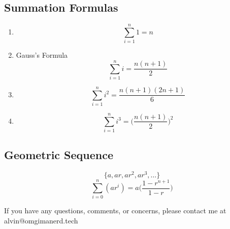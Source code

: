\documentclass[letterpaper, 12pt]{math}
\begin{document}
\subsection*{Summation Formulas}
\begin{enumerate}
  \item
    \[ \sum_{i=1}^{n}1 = n \]
  \item Gauss's Formula
    \[ \sum_{i=1}^{n}i = \frac{n(n+1)}{2} \]
  \item
    \[ \sum_{i=1}^{n}i^{2} = \frac{n(n+1)(2n+1)}{6} \]
  \item
    \[ \sum_{i=1}^{n}i^{3} = \bigg(\frac{n(n+1)}{2}\bigg)^{2} \]
\end{enumerate}

\subsection*{Geometric Sequence}
\[ \{a,ar,ar^{2},ar^{3},\dots\} \]
\[ \sum_{i=0}^{n}(ar^{i}) = a\bigg(\frac{1-r^{n+1}}{1-r}\bigg) \]

\begin{center}
  If you have any questions, comments, or concerns, please contact me at
  alvin@omgimanerd.tech
\end{center}
\end{document}
